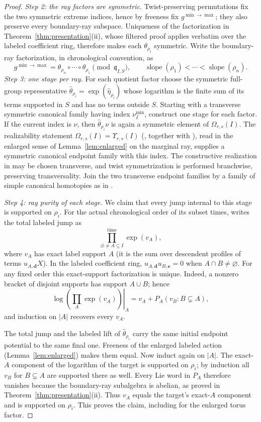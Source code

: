 \documentclass[11pt]{amsart}
\theoremstyle{definition}
\theoremstyle{remark}
\newcommand{\Om}{\Omega_{r,s}}
\begin{document}
\begin{proof}
\emph{Step 2: the ray factors are symmetric.}
Twist-preserving permutations fix the two symmetric extreme indices, hence by
freeness fix $g^{\min\to\max}$; they also preserve every boundary-ray
subspace. Uniqueness of the factorization in
Theorem~\ref{thm:presentation}(ii), whose filtered proof applies verbatim
over the labeled coefficient ring, therefore makes each
$\theta_{\rho_i}$ symmetric.
Write the boundary-ray factorization, in chronological convention, as
\[
g^{\min\to\max}
=\theta_{\rho_n}\circ\cdots\circ\theta_{\rho_1}
\pmod{\mathfrak q_{I,S}},
\qquad \operatorname{slope}(\rho_1)<\cdots<
\operatorname{slope}(\rho_n).
\]
\emph{Step 3: one stage per ray.}
For each quotient factor choose the symmetric full-group representative
$\widehat\theta_{\rho_i}=\exp(\widehat\eta_{\rho_i})$ whose logarithm is the
finite sum of its terms supported in $S$ and has no terms outside $S$.
Starting with a transverse symmetric canonical family having index
$\nu_I^{\min}$, construct
one stage for each factor. If the current index is $\nu$, then
$\widehat\theta_{\rho_i}\nu$ is again a symmetric element of $\Om(I)$. The
realizability statement $\Om(I)=\Upsilon_{r,s}(I)$
(\cite[Cor.~5.14]{GKT}, together with \cite[Prop.~3.46]{GKT}), read in the
enlarged sense of Lemma~\ref{lem:enlarged} on the marginal ray, supplies a
symmetric canonical endpoint family with this index. The constructive
realization in \cite[Thm.~5.13, Lem.~5.15]{GKT} may be chosen transverse, and
twist symmetrization is performed branchwise, preserving transversality. Join
the two transverse endpoint families by a family of simple canonical homotopies
as in \cite[Lem.~3.40]{GKT}.

\emph{Step 4: ray purity of each stage.}
We claim that every jump internal to this stage is supported on $\rho_i$.
For the actual chronological order of its subset times,
\cite[Thm.~5.9]{GKT} writes the total labeled jump as
\[
\prod_{\varnothing\ne A\subseteq I}^{\mathrm{time}}\exp(v_A),
\]
where $v_A$ has exact label support $A$ (it is the sum over descendent
profiles of terms $u_{A,\mathbf d}X$). In the labeled coefficient ring,
$u_{A,\mathbf d}u_{B,\mathbf e}=0$ when $A\cap B\ne\varnothing$.
For any fixed order this exact-support factorization is unique. Indeed,
a nonzero bracket of disjoint supports has support $A\cup B$; hence
\[
\left.\log\!\left(\prod_A\exp(v_A)\right)\right|_A
=v_A+P_A(v_B:B\subsetneq A),
\]
and induction on $\lvert A\rvert$ recovers every $v_A$.

The total jump and the labeled lift of $\widehat\theta_{\rho_i}$ carry the same initial
endpoint potential to the same final one. Freeness of the enlarged labeled
action (Lemma~\ref{lem:enlarged}) makes them equal. Now induct again on
$\lvert A\rvert$. The exact-$A$ component of the logarithm of the target is
supported on $\rho_i$; by induction all $v_B$ for $B\subsetneq A$ are supported
there as well. Every Lie word in $P_A$ therefore vanishes because the
boundary-ray subalgebra is abelian, as proved in
Theorem~\ref{thm:presentation}(ii). Thus $v_A$ equals the target's exact-$A$
component and is supported on $\rho_i$. This proves the claim, including for
the enlarged torus factor.


\end{proof}
\end{document}
